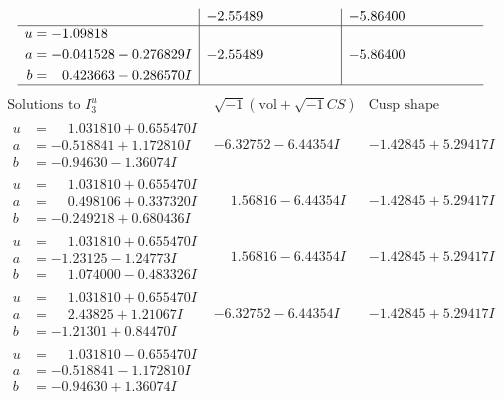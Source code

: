 \documentclass[1p]{elsarticle_modified}
\theoremstyle{definition}
\newcommand{\I}{\sqrt{-1}}
\begin{document}
$$\begin{array}{c|c|c}
 & -2.55489\phantom{ +0.000000I} & -5.86400\phantom{ +0.000000I} \\ \hline\begin{aligned}
u &= -1.09818\phantom{ +0.000000I} \\
a &= -0.041528 - 0.276829 I \\
b &= \phantom{-}0.423663 - 0.286570 I\end{aligned}
 & -2.55489\phantom{ +0.000000I} & -5.86400\phantom{ +0.000000I}\\
 \hline 
 \end{array}$$\newpage$$\begin{array}{c|c|c}  
\text{Solutions to }I^u_{3}& \I (\text{vol} + \sqrt{-1}CS) & \text{Cusp shape}\\
 \hline 
\begin{aligned}
u &= \phantom{-}1.031810 + 0.655470 I \\
a &= -0.518841 + 1.172810 I \\
b &= -0.94630 - 1.36074 I\end{aligned}
 & -6.32752 - 6.44354 I & -1.42845 + 5.29417 I \\ \hline\begin{aligned}
u &= \phantom{-}1.031810 + 0.655470 I \\
a &= \phantom{-}0.498106 + 0.337320 I \\
b &= -0.249218 + 0.680436 I\end{aligned}
 & \phantom{-}1.56816 - 6.44354 I & -1.42845 + 5.29417 I \\ \hline\begin{aligned}
u &= \phantom{-}1.031810 + 0.655470 I \\
a &= -1.23125 - 1.24773 I \\
b &= \phantom{-}1.074000 - 0.483326 I\end{aligned}
 & \phantom{-}1.56816 - 6.44354 I & -1.42845 + 5.29417 I \\ \hline\begin{aligned}
u &= \phantom{-}1.031810 + 0.655470 I \\
a &= \phantom{-}2.43825 + 1.21067 I \\
b &= -1.21301 + 0.84470 I\end{aligned}
 & -6.32752 - 6.44354 I & -1.42845 + 5.29417 I \\ \hline\begin{aligned}
u &= \phantom{-}1.031810 - 0.655470 I \\
a &= -0.518841 - 1.172810 I \\
b &= -0.94630 + 1.36074 I\end{aligned}

\end{array}$$
\end{document}
